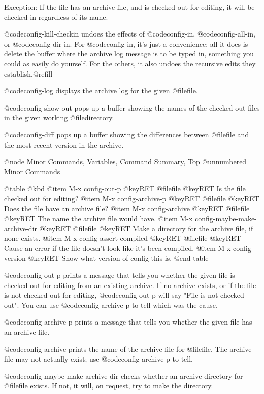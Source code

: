 Exception: If the file has an archive file, and is checked out for
editing, it will be checked in regardless of its name.

@code{config-kill-checkin} undoes the effects of @code{config-in},
@code{config-all-in}, or @code{config-dir-in}.  For @code{config-in},
it's just a convenience; all it does is delete the buffer where the
archive log message is to be typed in, something you could as easily
do yourself.  For the others, it also undoes the recursive edits they
establish.@refill

@code{config-log} displays the archive log for the given @file{file}.

@code{config-show-out} pops up a buffer showing the names of the
checked-out files in the given working @file{directory}.

@code{config-diff} pops up a buffer showing the differences between
@file{file} and the most recent version in the archive.

@node Minor Commands, Variables, Command Summary, Top
@unnumbered Minor Commands

@table @kbd
@item M-x config-out-p @key{RET} @file{file} @key{RET}
Is the file checked out for editing?
@item M-x config-archive-p @key{RET} @file{file} @key{RET}
Does the file have an archive file?
@item M-x config-archive @key{RET} @file{file} @key{RET}
The name the archive file would have.
@item M-x config-maybe-make-archive-dir @key{RET} @file{file} @key{RET}
Make a directory for the archive file, if none exists.
@item M-x config-assert-compiled @key{RET} @file{file} @key{RET}
Cause an error if the file doesn't look like it's been compiled.
@item M-x config-version @key{RET}
Show what version of config this is.
@end table

@code{config-out-p} prints a message that tells you whether the given
file is checked out for editing from an existing archive.  If no
archive exists, or if the file is not checked out for editing,
@code{config-out-p} will say "File is not checked out".  You can use
@code{config-archive-p} to tell which was the cause.

@code{config-archive-p} prints a message that tells you whether the
given file has an archive file.

@code{config-archive} prints the name of the archive file for
@file{file}.  The archive file may not actually exist; use
@code{config-archive-p} to tell.

@code{config-maybe-make-archive-dir} checks whether an archive
directory for @file{file} exists.  If not, it will, on request, try to
make the directory.

